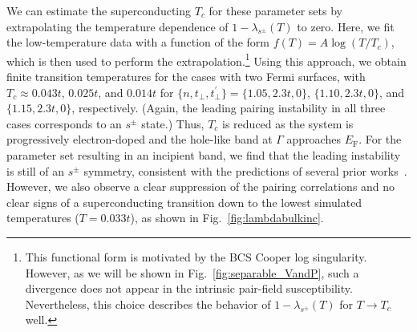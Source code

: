 \documentclass[prb,twocolumn,amsmath,amssymb,superscriptaddress,floatfix,nofootinbib]{revtex4-2}
\begin{document}
We can estimate the superconducting $T_c$ for these parameter sets by extrapolating the temperature dependence of $1-\lambda_{s^\pm}(T)$ to zero. Here, we fit the low-temperature data with a function of the form $f(T) = A\log(T/T_c)$, which is then used to perform the extrapolation.\footnote{This functional form is motivated by the BCS Cooper log singularity. However, as we will be shown in Fig.~\ref{fig:separable_VandP}, such a divergence does not appear in the intrinsic pair-field susceptibility. Nevertheless, this choice describes the behavior of $1-\lambda_{s^\pm}(T)$ for $T\rightarrow T_c$ well.} Using this approach, we obtain finite transition temperatures for the cases with two Fermi surfaces, with $T_c \approx 0.043t$, $0.025t$, and $0.014t$ for $\{n, t^{\phantom\prime}_\perp, t^\prime_\perp\} = \{1.05, 2.3t, 0\}$, $\{1.10, 2.3t, 0\}$, and $\{1.15, 2.3t, 0\}$, respectively. (Again, the leading pairing instability in all three cases corresponds to an $s^\pm$ state.) Thus, $T_c$ is reduced as the system is progressively electron-doped and the hole-like band at $\Gamma$ approaches $E_\mathrm{F}$. For the parameter set resulting in an incipient band, we find that the leading instability is still of an $s^\pm$ symmetry, consistent with the predictions of several prior works~\cite{BangNJP2014, LinscheidPRL2016, Mishra2016, KurokiFlex2020, Maier2019, RademakerEnhanced2021}. However, we also observe a clear suppression of the pairing correlations and no clear signs of a superconducting transition down to the lowest simulated temperatures ($T = 0.033t$), as shown in Fig.~\ref{fig:lambdabulkinc}. 
\end{document}
